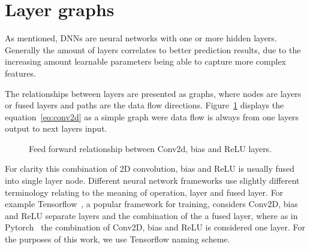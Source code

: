 \documentclass[12pt,a4paper,english
]{tunithesis}
\begin{document}
\section{Layer graphs}
As mentioned, DNNs are neural networks with one or more hidden layers. Generally the amount of layers correlates to better prediction results, due to the increasing amount learnable parameters being able to capture more complex features.

The relationships between layers are presented as graphs, where nodes are layers or fused layers and paths are the data flow directions. Figure~\ref{fig:conv2d-layer} displays the equation~\ref{eq:conv2d} as a simple graph were data flow is always from one layers output to next layers input.

\begin{figure}[ht]
  \centering
  \caption{Feed forward relationship between Conv2d, bias and ReLU layers.}
  \label{fig:conv2d-layer}
\end{figure}
For clarity this combination of 2D convolution, bias and ReLU is usually fused into single layer node. Different neural network frameworks use slightly different terminology relating to the meaning of operation, layer and fused layer. For example Tensorflow~\cite{tensorflow2015-whitepaper}, a popular framework for training, considers Conv2D, bias and ReLU separate layers and the combination of the a fused layer, where as in Pytorch~\cite{pytorch} the combination of Conv2D, bias and ReLU is considered one layer. For the purposes of this work, we use Tensorflow naming scheme.
\end{document}
